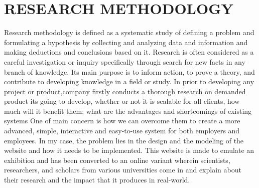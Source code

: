 \chapter{RESEARCH METHODOLOGY} 
\label{ChapterResearchMethodology} 


Research methodology is defined as a systematic study of defining a problem and formulating a hypothesis by collecting and analyzing data and information and making deductions and conclusions based on it. Research is often considered as a careful investigation or inquiry specifically through search for new facts in any branch of knowledge. Its main purpose is to inform action, to prove a theory, and contribute to developing knowledge in a field or study. In prior to developing any project or product,company firstly conducts a thorough research on demanded product its going to develop, whether or not it is scalable for all clients, how much will it benefit them; what are the advantages and shortcomings of existing systems One of main concern is how we can overcome them to create a more advanced, simple, interactive and easy-to-use system for both employers and employees. In my case, the problem lies in the design and the modeling of the website and how it needs to be implemented. This website is made to emulate an exhibition and has been converted to an online variant wherein scientists, researchers, and scholars from various universities come in and explain about their research and the impact that it produces in real-world.

		



